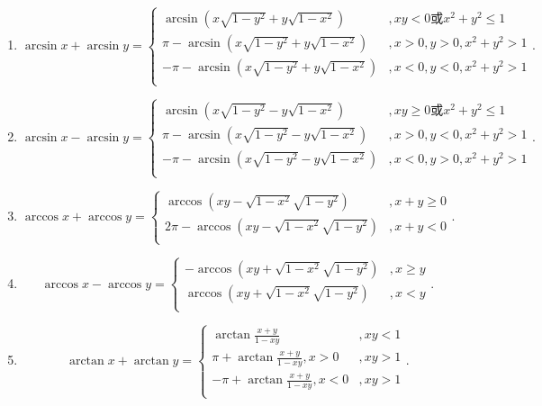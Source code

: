 \documentclass[../../main.tex]{subfiles}%
\begin{document}
\begin{theorem}[常用反三角函数性质]\label{theorem:常用反三角函数性质}
\begin{enumerate}
\item $$\arcsin x+\arcsin y=\begin{cases}
\arcsin \left( x\sqrt{1-y^2}+y\sqrt{1-x^2} \right) &,xy<0\text{或}x^2+y^2\leqslant 1\\
\pi -\arcsin \left( x\sqrt{1-y^2}+y\sqrt{1-x^2} \right) &,x>0,y>0,x^2+y^2>1\\
-\pi -\arcsin \left( x\sqrt{1-y^2}+y\sqrt{1-x^2} \right) &,x<0,y<0,x^2+y^2>1\\
\end{cases}.$$

\item $$\arcsin x-\arcsin y=\begin{cases}
\arcsin \left( x\sqrt{1-y^2}-y\sqrt{1-x^2} \right) &,xy\geqslant 0\text{或}x^2+y^2\leqslant 1\\
\pi -\arcsin \left( x\sqrt{1-y^2}-y\sqrt{1-x^2} \right) &,x>0,y<0,x^2+y^2>1\\
-\pi -\arcsin \left( x\sqrt{1-y^2}-y\sqrt{1-x^2} \right) &,x<0,y>0,x^2+y^2>1\\
\end{cases}.$$

\item $$\arccos x+\arccos y=\begin{cases}
\arccos \left( xy-\sqrt{1-x^2}\sqrt{1-y^2} \right) &,x+y\geqslant 0\\
2\pi -\arccos \left( xy-\sqrt{1-x^2}\sqrt{1-y^2} \right) &,x+y<0\\
\end{cases}.$$

\item $$\arccos x-\arccos y=\begin{cases}
-\arccos \left( xy+\sqrt{1-x^2}\sqrt{1-y^2} \right) &,x\geqslant y\\
\arccos \left( xy+\sqrt{1-x^2}\sqrt{1-y^2} \right) &,x<y\\
\end{cases}.$$

\item $$\arctan x+\arctan y=\begin{cases}
\arctan \frac{x+y}{1-xy}&,xy<1\\
\pi +\arctan \frac{x+y}{1-xy},x>0&,xy>1\\
-\pi +\arctan \frac{x+y}{1-xy},x<0&,xy>1\\
\end{cases}.$$


\end{enumerate}
\end{theorem}
\end{document}

